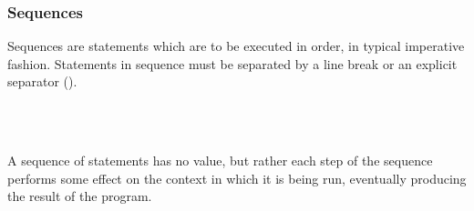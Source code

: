 \subsubsection{Sequences}

Sequences are statements which are to be executed in order, in typical
imperative fashion. Statements in sequence must be separated by a line break or
an explicit separator (\op{;}).

\begin{bnf*}
     \\
     \\
\end{bnf*}

A sequence of statements has no value, but rather each step of the sequence
performs some effect on the context in which it is being run, eventually
producing the result of the program.

\begin{prooftree}
\end{prooftree}

\begin{prooftree}
\end{prooftree}
